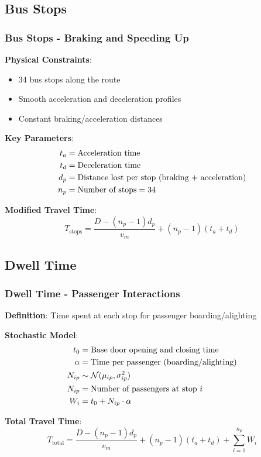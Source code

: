 \documentclass[12pt]{beamer}
\begin{document}
\subsection{Bus Stops}
\begin{frame}
\frametitle{Bus Stops - Braking and Speeding Up}
\textbf{Physical Constraints}:
\begin{itemize}
\item 34 bus stops along the route
\item Smooth acceleration and deceleration profiles
\item Constant braking/acceleration distances
\end{itemize}

\vspace{0.3cm}
\textbf{Key Parameters}:
\begin{align}
t_a &= \text{Acceleration time}  \notag\\
t_d &= \text{Deceleration time}  \notag\\
d_p &= \text{Distance lost per stop (braking + acceleration)}  \notag\\
n_p &= \text{Number of stops} = 34 \notag
\end{align}

\vspace{0.3cm}
\textbf{Modified Travel Time}:
\begin{equation}
T_{\text{stops}} = \frac{D - (n_p-1)d_p}{v_m} + (n_p-1)(t_a + t_d)
\end{equation}
\end{frame}

\subsection{Dwell Time}
\begin{frame}
\frametitle{Dwell Time - Passenger Interactions}
\textbf{Definition}: Time spent at each stop for passenger boarding/alighting

\vspace{0.3cm}
\textbf{Stochastic Model}:
\begin{align}
t_0 &= \text{Base door opening and closing time}  \notag\\
\alpha &= \text{Time per passenger (boarding/alighting)}  \notag\\
N_{ip} &\sim \mathcal{N}(\mu_{ip}, \sigma_{ip}^2)  \notag\\
N_{ip} &= \text{Number of passengers at stop } i \notag \\
W_i &= t_0 + N_{ip} \cdot \alpha  \notag
\end{align}

\vspace{0.3cm}
\textbf{Total Travel Time}:
\begin{equation}
T_{\text{total}} = \frac{D - (n_p-1)d_p}{v_m} + (n_p-1)(t_a + t_d) + \sum_{i=1}^{n_p} W_i
\end{equation}
\end{frame}
\end{document}
